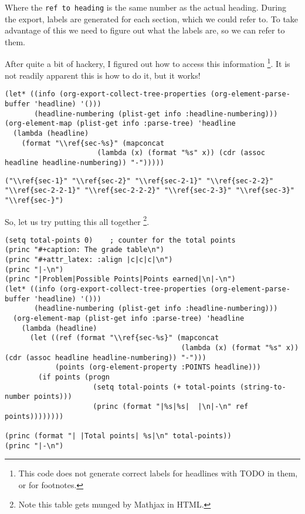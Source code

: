 \documentclass[11pt]{article}
\begin{document}
Where the \verb~ref to heading~ is the same number as the actual heading. During the export, labels are generated for each section, which we could refer to. To take advantage of this we need to figure out what the labels are, so we can refer to them. 

After quite a bit of hackery, I figured out how to access this information \footnote{This code does not generate correct labels for headlines with TODO in them, or for footnotes.}. It is not readily apparent this is how to do it, but it works!

\begin{verbatim}
(let* ((info (org-export-collect-tree-properties (org-element-parse-buffer 'headline) '()))
       (headline-numbering (plist-get info :headline-numbering)))
(org-element-map (plist-get info :parse-tree) 'headline
  (lambda (headline) 
    (format "\\ref{sec-%s}" (mapconcat 
                      (lambda (x) (format "%s" x)) (cdr (assoc headline headline-numbering)) "-")))))
\end{verbatim}

\begin{verbatim}
("\\ref{sec-1}" "\\ref{sec-2}" "\\ref{sec-2-1}" "\\ref{sec-2-2}" "\\ref{sec-2-2-1}" "\\ref{sec-2-2-2}" "\\ref{sec-2-3}" "\\ref{sec-3}" "\\ref{sec-}")
\end{verbatim}


So, let us try putting this all together \footnote{Note this table gets munged by Mathjax in HTML.}.

\begin{verbatim}
(setq total-points 0)    ; counter for the total points
(princ "#+caption: The grade table\n")
(princ "#+attr_latex: :align |c|c|c|\n")
(princ "|-\n")
(princ "|Problem|Possible Points|Points earned|\n|-\n")
(let* ((info (org-export-collect-tree-properties (org-element-parse-buffer 'headline) '()))
       (headline-numbering (plist-get info :headline-numbering)))
  (org-element-map (plist-get info :parse-tree) 'headline
    (lambda (headline) 
      (let ((ref (format "\\ref{sec-%s}" (mapconcat 
                                          (lambda (x) (format "%s" x)) (cdr (assoc headline headline-numbering)) "-")))
            (points (org-element-property :POINTS headline)))
        (if points (progn
                     (setq total-points (+ total-points (string-to-number points)))
                     (princ (format "|%s|%s|  |\n|-\n" ref points))))))))

(princ (format "| |Total points| %s|\n" total-points))
(princ "|-\n")
\end{verbatim}
\end{document}
